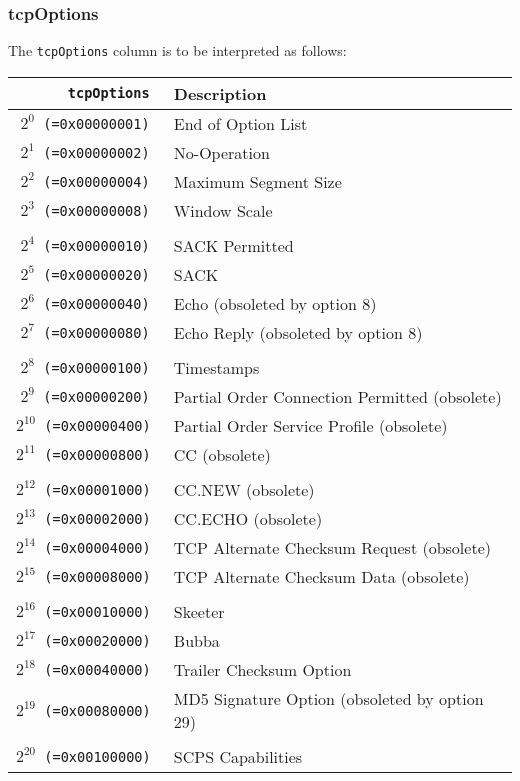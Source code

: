 \documentclass[documentation]{subfiles}
\begin{document}
\subsubsection{tcpOptions}\label{tcpOptions}
The {\tt tcpOptions} column is to be interpreted as follows:
\begin{longtable}{>{\tt}rl}
    \toprule
    {\bf tcpOptions} & {\bf Description}\\
    \midrule\endhead%
    $2^{0}$  (=0x00000001) & End of Option List\\
    $2^{1}$  (=0x00000002) & No-Operation\\
    $2^{2}$  (=0x00000004) & Maximum Segment Size\\
    $2^{3}$  (=0x00000008) & Window Scale\\
    \\
    $2^{4}$  (=0x00000010) & SACK Permitted\\
    $2^{5}$  (=0x00000020) & SACK\\
    $2^{6}$  (=0x00000040) & Echo (obsoleted by option 8)\\
    $2^{7}$  (=0x00000080) & Echo Reply (obsoleted by option 8)\\
    \\
    $2^{8}$  (=0x00000100) & Timestamps\\
    $2^{9}$  (=0x00000200) & Partial Order Connection Permitted (obsolete)\\
    $2^{10}$ (=0x00000400) & Partial Order Service Profile (obsolete)\\
    $2^{11}$ (=0x00000800) & CC (obsolete)\\
    \\
    $2^{12}$ (=0x00001000) & CC.NEW (obsolete)\\
    $2^{13}$ (=0x00002000) & CC.ECHO (obsolete)\\
    $2^{14}$ (=0x00004000) & TCP Alternate Checksum Request (obsolete)\\
    $2^{15}$ (=0x00008000) & TCP Alternate Checksum Data (obsolete)\\
    \\
    $2^{16}$ (=0x00010000) & Skeeter\\
    $2^{17}$ (=0x00020000) & Bubba\\
    $2^{18}$ (=0x00040000) & Trailer Checksum Option\\
    $2^{19}$ (=0x00080000) & MD5 Signature Option (obsoleted by option 29)\\
    \\
    $2^{20}$ (=0x00100000) & SCPS Capabilities\\

\end{longtable}
\end{document}

